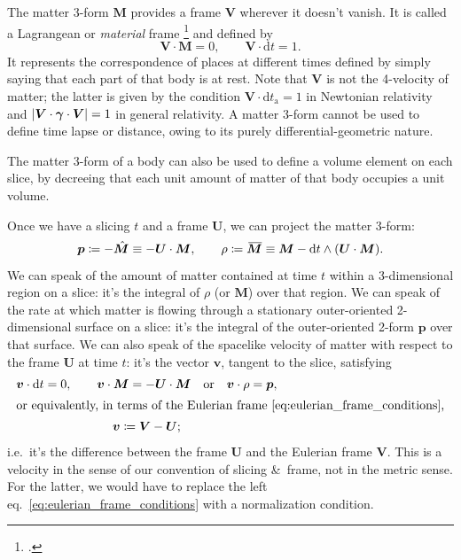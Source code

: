 \documentclass[\ifafour a4paper,12pt,\else a5paper,10pt,\fi%
onecolumn,oneside,article,%
british%
]{memoir}
\theoremstyle{remark}
\theoremstyle{innote}
\newcommand*{\citep}{\footcites}%
\newcommand*{\amp}{\&}
\newcommand*{\di}{\mathrm{d}}%
\newcommand*{\defd}{\coloneqq}
\DeclarePairedDelimiter\abs{\lvert}{\rvert}
\renewcommand*{\|}{\nonscript\,\vert\nonscript\;\mathopen{}}
\newcommand*{\eqn}{eq.}%
\newcommand*{\ie}{{i.e.}}
\newcommand*{\widebar}[1]{{\mkern1.5mu\skew{2}\overline{\mkern-1.5mu#1\mkern-1.5mu}\mkern 1.5mu}}
\newcommand*{\ydd}{\rho}
\newcommand*{\yd}{\ydd}
\newcommand*{\yrr}{M}
\newcommand*{\yr}{\bm{\yrr}}
\newcommand*{\ytn}{t_{\textrm{a}}}
\newcommand*{\yjj}{p}
\newcommand*{\yj}{\bm{\yjj}}
\newcommand*{\yvvt}{v}
\newcommand*{\yvt}{\bm{\yvvt}}
\newcommand*{\yffg}{\gamma}
\newcommand*{\yfg}{\bm{\yffg}}
\newcommand*{\yFF}{U}
\newcommand*{\yF}{\bm{\yFF}}
\newcommand*{\ynn}{V}
\newcommand*{\yn}{\bm{\ynn}}
\begin{document}
The matter 3-form $\yr$ provides a frame $\yn$ wherever it doesn't vanish.
It is called a Lagrangean or \emph{material} frame
\citep{smarretal1978,smarretal1980} and defined by
\begin{equation}
  \label{eq:eulerian_frame_conditions}
  \yn \cdot \yr = 0, \qquad \yn \cdot \di t = 1.
\end{equation}
It represents the correspondence of places at different times defined by
simply saying that each part of that body is at rest. Note that $\yn$ is
not the 4-velocity of matter; the latter is given by the condition
$\yn\cdot \di\ytn = 1$ in Newtonian relativity and
$\abs{\yn\cdot\yfg\cdot\yn} = 1$ in general relativity. A matter 3-form
cannot be used to define time lapse or distance, owing to its purely
differential-geometric nature.

The matter 3-form of a body can also be used to define a volume element on
each slice, by decreeing that each unit amount of matter of that body
occupies a unit volume.

Once we have a slicing $t$ and a frame $\yF$, we can project the matter
3-form:
\begin{equation}
  \label{eq:project_matter_form}
  \yj \defd  -\Hat{\yr} \equiv -\yF\cdot\yr,
  \qquad
  \yd \defd \widebar{\yr} \equiv \yr - \di t \land (\yF\cdot\yr).
\end{equation}
We can speak of the amount of matter contained at time $t$ within a
3-dimensional region on a slice: it's the integral of $\yd$ (or $\yr$) over
that region. We can speak of the rate at which matter is flowing through a
stationary outer-oriented 2-dimensional surface on a slice: it's the
integral of the outer-oriented 2-form $\yj$ over that surface. We can also
speak of the spacelike velocity of matter with respect to the frame $\yF$
at time $t$: it's the vector $\yvt$, tangent to the slice, satisfying
\begin{subequations}
  \label{eq:matter_velocity_in_frame}
  \begin{gather}
    \yvt \cdot \di t = 0, \qquad
    \yvt \cdot \yr = - \yF \cdot \yr
    \quad\text{or}\quad
    \yvt \cdot \yd = \yj,
    \\
    \shortintertext{or equivalently, in terms of the Eulerian frame~\eqref{eq:eulerian_frame_conditions},}
    \yvt \defd \yn-\yF;
  \end{gather}
\end{subequations}
\ie\ it's the difference between the frame $\yF$ and the Eulerian frame
$\yn$. This is a velocity in the sense of our convention of slicing \amp\
frame, not in the metric sense. For the latter, we would have to replace
the left \eqn~\eqref{eq:eulerian_frame_conditions} with a normalization
condition.
\end{document}
